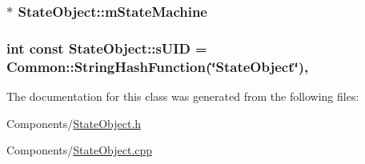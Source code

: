 \subsubsection[{\texorpdfstring{m\+State\+Machine}{mStateMachine}}]{$\ast$ State\+Object\+::m\+State\+Machine\hspace{0.3cm}{\ttfamily [private]}}\hypertarget{classStateObject_aa33d984d1ab329928d9e747856493e6e}{}\label{classStateObject_aa33d984d1ab329928d9e747856493e6e}
\subsubsection[{\texorpdfstring{s\+U\+ID}{sUID}}]{\setlength{\rightskip}{0pt plus 5cm}int const State\+Object\+::s\+U\+ID = {\bf Common\+::\+String\+Hash\+Function}(\char`\"{}State\+Object\char`\"{})\hspace{0.3cm}{\ttfamily [static]}, {\ttfamily [private]}}\hypertarget{classStateObject_a13bb8cd307785ed2284f7f2a421a3be9}{}\label{classStateObject_a13bb8cd307785ed2284f7f2a421a3be9}


The documentation for this class was generated from the following files\+:\begin{DoxyCompactItemize}
\item 
Components/\hyperlink{StateObject_8h}{State\+Object.\+h}\item 
Components/\hyperlink{StateObject_8cpp}{State\+Object.\+cpp}\end{DoxyCompactItemize}
